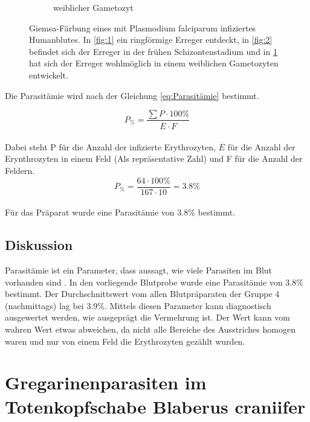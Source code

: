 \documentclass[oneside,10pt,a4paper]{report}
\begin{document}
\begin{figure}[H]
\begin{subfigure}[b]{0.3\textwidth}
						\caption{weiblicher Gametozyt}
						\label{fig:3}
					\end{subfigure}
					\caption{Giemsa-Färbung eines mit Plasmodium falciparum infiziertes Humanblutes. In \ref{fig:1} ein ringförmige Erreger entdeckt, in \ref{fig:2} befindet sich der Erreger in der frühen Schizontenstadium und in \ref{fig:3} hat sich der Erreger wohlmöglich in einem weiblichen Gametozyten entwickelt.}
					\label{fig: p_falciparum}
				\end{figure}
				
				Die Parasitämie wird nach der Gleichung \ref*{eq:Parasitämie} bestimmt.
				
				\begin{equation}\label{eq:Parasitämie}
					P_{\%} = \frac{\sum P \cdot 100 \%}{\overline{E} \cdot F}
				\end{equation}
				\\
				Dabei steht P für die Anzahl der infizierte Erythrozyten, $\overline{E}$ für die Anzahl der Erynthrozyten in einem Feld (Als repräsentative Zahl) und F für die Anzahl der Feldern.\\
				
				\begin{equation}\nonumber
					P_{\%} = \frac{64 \cdot 100 \%}{167 \cdot 10} = \underline{3.8 \%}
				\end{equation}
				\\
				Für das Präparat wurde eine Parasitämie von 3.8$\%$ bestimmt.
			\subsection{Diskussion}
				Parasitämie ist ein Parameter, dass aussagt, wie viele Parasiten im Blut vorhanden sind \cite{parasitämie}.
				In den vorliegende Blutprobe wurde eine Parasitämie von 3.8$\%$ bestimmt.
				Der Durchschnittswert vom allen Blutpräparaten der Gruppe 4 (nachmittags) lag bei 3.9$\%$. Mittels diesen Parameter kann diagnostisch ausgewertet werden, wie ausgeprägt die Vermehrung ist.
				Der Wert kann vom wahren Wert etwas abweichen, da nicht alle Bereiche des Ausstriches homogen waren und nur von einem Feld die Erythrozyten gezählt wurden.\\
	
		\section{Gregarinenparasiten im Totenkopfschabe Blaberus craniifer}
\end{document}
